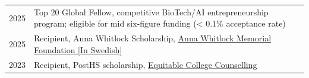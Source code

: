 \begin{longtable}[l]{@{}p{} p{}}

    2025 & Top 20 Global Fellow, competitive BioTech/AI entrepreneurship program; eligible for mid six-figure funding (< 0.1\% acceptance rate)\\

    2025 & Recipient, Anna Whitlock Scholarship, \href{https://whitlocks.se/ai-och-biologi-pa-uc-berkeley/}{Anna Whitlock Memorial Foundation [In Swedish]}\\

    2023 & Recipient, PostHS scholarship, \href{https://www.linkedin.com/company/posths/posts/?feedView=all}{Equitable College Counselling}\\
   
\end{longtable}
